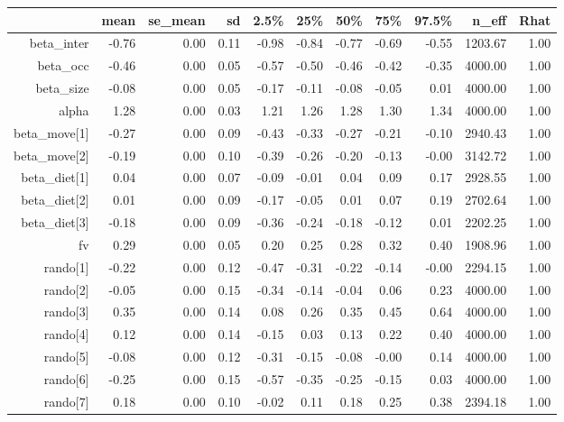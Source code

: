 \begin{table}[ht]
\centering
\begin{tabular}{rrrrrrrrrrr}
  \hline
 & mean & se\_mean & sd & 2.5\% & 25\% & 50\% & 75\% & 97.5\% & n\_eff & Rhat \\ 
  \hline
beta\_inter & -0.76 & 0.00 & 0.11 & -0.98 & -0.84 & -0.77 & -0.69 & -0.55 & 1203.67 & 1.00 \\ 
  beta\_occ & -0.46 & 0.00 & 0.05 & -0.57 & -0.50 & -0.46 & -0.42 & -0.35 & 4000.00 & 1.00 \\ 
  beta\_size & -0.08 & 0.00 & 0.05 & -0.17 & -0.11 & -0.08 & -0.05 & 0.01 & 4000.00 & 1.00 \\ 
  alpha & 1.28 & 0.00 & 0.03 & 1.21 & 1.26 & 1.28 & 1.30 & 1.34 & 4000.00 & 1.00 \\ 
  beta\_move[1] & -0.27 & 0.00 & 0.09 & -0.43 & -0.33 & -0.27 & -0.21 & -0.10 & 2940.43 & 1.00 \\ 
  beta\_move[2] & -0.19 & 0.00 & 0.10 & -0.39 & -0.26 & -0.20 & -0.13 & -0.00 & 3142.72 & 1.00 \\ 
  beta\_diet[1] & 0.04 & 0.00 & 0.07 & -0.09 & -0.01 & 0.04 & 0.09 & 0.17 & 2928.55 & 1.00 \\ 
  beta\_diet[2] & 0.01 & 0.00 & 0.09 & -0.17 & -0.05 & 0.01 & 0.07 & 0.19 & 2702.64 & 1.00 \\ 
  beta\_diet[3] & -0.18 & 0.00 & 0.09 & -0.36 & -0.24 & -0.18 & -0.12 & 0.01 & 2202.25 & 1.00 \\ 
  fv & 0.29 & 0.00 & 0.05 & 0.20 & 0.25 & 0.28 & 0.32 & 0.40 & 1908.96 & 1.00 \\ 
  rando[1] & -0.22 & 0.00 & 0.12 & -0.47 & -0.31 & -0.22 & -0.14 & -0.00 & 2294.15 & 1.00 \\ 
  rando[2] & -0.05 & 0.00 & 0.15 & -0.34 & -0.14 & -0.04 & 0.06 & 0.23 & 4000.00 & 1.00 \\ 
  rando[3] & 0.35 & 0.00 & 0.14 & 0.08 & 0.26 & 0.35 & 0.45 & 0.64 & 4000.00 & 1.00 \\ 
  rando[4] & 0.12 & 0.00 & 0.14 & -0.15 & 0.03 & 0.13 & 0.22 & 0.40 & 4000.00 & 1.00 \\ 
  rando[5] & -0.08 & 0.00 & 0.12 & -0.31 & -0.15 & -0.08 & -0.00 & 0.14 & 4000.00 & 1.00 \\ 
  rando[6] & -0.25 & 0.00 & 0.15 & -0.57 & -0.35 & -0.25 & -0.15 & 0.03 & 4000.00 & 1.00 \\ 
  rando[7] & 0.18 & 0.00 & 0.10 & -0.02 & 0.11 & 0.18 & 0.25 & 0.38 & 2394.18 & 1.00 \\ 

\end{tabular}
\end{table}
